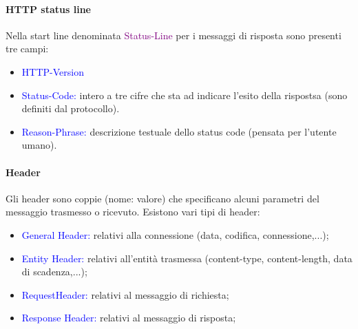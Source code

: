 \paragraph{HTTP status line} Nella start line denominata \textcolor{purple}{Status-Line} per i messaggi di risposta sono presenti tre campi:
\begin{itemize}
    \item \textcolor{blue}{HTTP-Version}
    \item \textcolor{blue}{Status-Code:} intero a tre cifre che sta ad indicare l'esito della rispostsa (sono definiti dal protocollo).
    \item \textcolor{blue}{Reason-Phrase:} descrizione testuale dello status code (pensata per l’utente umano). 
\end{itemize}

\paragraph{Header}
Gli header sono coppie (nome: valore) che specificano alcuni parametri del messaggio trasmesso o ricevuto. Esistono vari tipi di header:
\begin{itemize}
    \item \textcolor{blue}{General Header:} relativi alla connessione (data, codifica, connessione,...);
    \item \textcolor{blue}{Entity Header:} relativi all’entità trasmessa (content-type, content-length, data di scadenza,...);
    \item \textcolor{blue}{RequestHeader:} relativi al messaggio di richiesta;
    \item \textcolor{blue}{Response Header:} relativi al messaggio di risposta;
\end{itemize}
